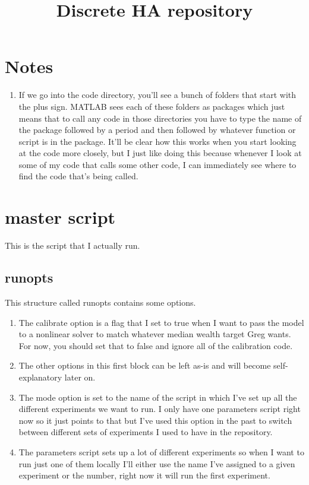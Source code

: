 \documentclass{article}
\title{Discrete HA repository}
\begin{document}
\maketitle

\section{Notes}
	\begin{enumerate}
		\item If we go into the code directory, you'll see a bunch of folders that start with the plus sign. MATLAB sees each of these folders as packages which just means that to call any code in those directories you have to type the name of the package followed by a period and then followed by whatever function or script is in the package. It'll be clear how this works when you start looking at the code more closely, but I just like doing this because whenever I look at some of my code that calls some other code, I can immediately see where to find the code that's being called.
	\end{enumerate}

\section{master script}
	This is the script that I actually run. 
	\subsection{runopts}
		This structure called runopts contains some options.
		\begin{enumerate}
			\item The calibrate option is a flag that I set to true when I want to pass the model to a nonlinear solver to match whatever median wealth target Greg wants. For now, you should set that to false and ignore all of the calibration code.
			\item The other options in this first block can be left as-is and will become self-explanatory later on.
			\item The mode option is set to the name of the script in which I've set up all the different experiments we want to run. I only have one parameters script right now so it just points to that but I've used this option in the past to switch between different sets of experiments I used to have in the repository.
			\item The parameters script sets up a lot of different experiments so when I want to run just one of them locally I'll either use the name I've assigned to a given experiment or the number, right now it will run the first experiment.
		\end{enumerate}
\end{document}
